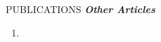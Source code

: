 \begin{rSection}{PUBLICATIONS}
\noindent\textbf{\textit{Other Articles}}
\begin{enumerate}
\item {}
\end{enumerate}

\end{rSection}
